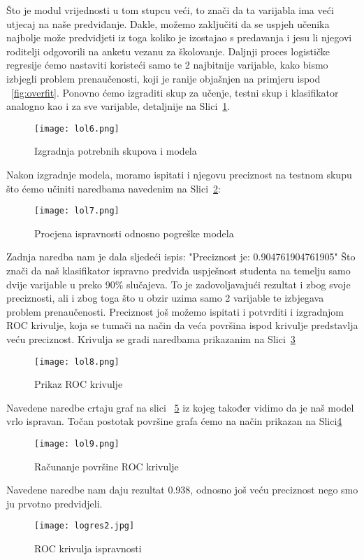 \documentclass[times, utf8, zavrsni, numeric]{fer}
\begin{document}
Što je modul vrijednosti u tom stupcu veći, to znači da ta varijabla ima veći utjecaj na naše predviđanje. Dakle, možemo zaključiti da se uspjeh učenika najbolje može predvidjeti iz toga koliko je izostajao s predavanja i jesu li njegovi roditelji odgovorili na anketu vezanu za školovanje. Daljnji proces logističke regresije ćemo nastaviti koristeći samo te 2 najbitnije varijable, kako bismo izbjegli problem prenaučenosti, koji je ranije objašnjen na primjeru ispod ~\ref{fig:overfit}. Ponovno ćemo izgraditi skup za učenje, testni skup i klasifikator analogno kao i za sve varijable, detaljnije na Slici~\ref{fig:lol6}.
\begin{figure}[H]
\centering
\texttt{[image: lol6.png]}
\caption{Izgradnja potrebnih skupova i modela}
\label{fig:lol6}
\end{figure}
Nakon izgradnje modela, moramo ispitati i njegovu preciznost na testnom skupu što ćemo učiniti naredbama navedenim na Slici~\ref{fig:lol7}:
\begin{figure}[H]
\centering
\texttt{[image: lol7.png]}
\caption{Procjena ispravnosti odnosno pogreške modela}
\label{fig:lol7}
\end{figure}


Zadnja naredba nam je dala sljedeći ispis:
"Preciznost je:  0.904761904761905"
Što znači da naš klasifikator ispravno predviđa uspješnost studenta na temelju samo dvije varijable u preko 90\% slučajeva. To je zadovoljavajući rezultat i zbog svoje preciznosti, ali i zbog toga što u obzir uzima samo 2 varijable te izbjegava problem prenaučenosti. Preciznost još možemo ispitati i potvrditi i izgradnjom ROC krivulje, koja se tumači na način da veća površina ispod krivulje predstavlja veću preciznost. Krivulja se gradi naredbama prikazanim na Slici~\ref{fig:lol8}
\begin{figure}[H]
\centering
\texttt{[image: lol8.png]}
\caption{Prikaz ROC krivulje}
\label{fig:lol8}
\end{figure}

Navedene naredbe crtaju graf na slici ~\ref{fig:logres2} iz kojeg također vidimo da je naš model vrlo ispravan. Točan postotak površine grafa ćemo na način prikazan na Slici\ref{fig:lol9}
\begin{figure}[H]
\centering
\texttt{[image: lol9.png]}
\caption{Računanje površine ROC krivulje}
\label{fig:lol9}
\end{figure}

Navedene naredbe nam daju rezultat 0.938, odnosno još veću preciznost nego smo ju prvotno predvidjeli. 
\begin{figure}[H]
\centering
\texttt{[image: logres2.jpg]}
\caption{ROC krivulja ispravnosti}
\label{fig:logres2}
\end{figure}
\end{document}
